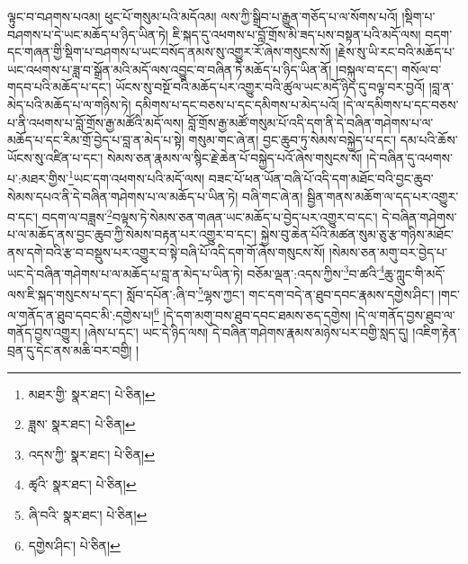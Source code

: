 ལྟུང་བ་བཤགས་པའམ། ཕུང་པོ་གསུམ་པའི་མདོའམ། ལས་ཀྱི་སྒྲིབ་པ་རྒྱུན་གཅོད་པ་ལ་སོགས་པའོ། །སྡིག་པ་བཤགས་པ་དེ་ཡང་མཆོད་པ་ཉིད་ཡིན་ཏེ། ཇི་སྐད་དུ་འཕགས་པ་བློ་གྲོས་མི་ཟད་པས་བསྟན་པའི་མདོ་ལས། བདག་དང་གཞན་གྱི་སྡིག་པ་བཤགས་པ་ཡང་བསོད་ནམས་སུ་འགྱུར་རོ་ཞེས་གསུངས་སོ། །རྗེས་སུ་ཡི་རང་བའི་མཆོད་པ་ཡང་འཕགས་པ་ཟླ་བ་སྒྲོན་མའི་མདོ་ལས་འབྱུང་བ་བཞིན་ཏེ་མཆོད་པ་ཉིད་ཡིན་ནོ། །བསྐུལ་བ་དང་། གསོལ་བ་གདབ་པའི་མཆོད་པ་དང་། ཡོངས་སུ་བསྔོ་བའི་མཆོད་པར་འགྱུར་བའི་ཚུལ་ཡང་མདོ་ཉིད་དུ་བལྟ་བར་བྱའོ། །བླ་ན་མེད་པའི་མཆོད་པ་ལ་གཉིས་ཏེ། དམིགས་པ་དང་བཅས་པ་དང་དམིགས་པ་མེད་པའོ། །དེ་ལ་དམིགས་པ་དང་བཅས་པ་ནི་འཕགས་པ་བློ་གྲོས་རྒྱ་མཚོའི་མདོ་ལས། བློ་གྲོས་རྒྱ་མཚོ་གསུམ་པོ་འདི་དག་ནི་དེ་བཞིན་གཤེགས་པ་ལ་མཆོད་པ་དང་རིམ་གྲོ་བྱེད་པ་བླ་ན་མེད་པ་སྟེ། གསུམ་གང་ཞེ་ན། བྱང་ཆུབ་ཏུ་སེམས་བསྐྱེད་པ་དང་། དམ་པའི་ཆོས་ཡོངས་སུ་འཛིན་པ་དང་། སེམས་ཅན་རྣམས་ལ་སྙིང་རྗེ་ཆེན་པོ་བསྐྱེད་པའོ་ཞེས་གསུངས་སོ། །དེ་བཞིན་དུ་འཕགས་པ་:མཐར་གྱིས་\footnote{མཐར་གྱི་  སྣར་ཐང་།  པེ་ཅིན། }ཡང་དག་འཕགས་པའི་མདོ་ལས། བཟང་པོ་ཕན་ཡོན་བཞི་པོ་འདི་དག་མཐོང་བའི་བྱང་ཆུབ་སེམས་དཔའ་ནི་དེ་བཞིན་གཤེགས་པ་ལ་མཆོད་པ་ཡིན་ཏེ། བཞི་གང་ཞེ་ན། སྦྱིན་གནས་མཆོག་ལ་དད་པར་འགྱུར་བ་དང་། བདག་ལ་བཟླས་\footnote{ཟླས་  སྣར་ཐང་།  པེ་ཅིན། }བལྟས་ཏེ་སེམས་ཅན་གཞན་ཡང་མཆོད་པ་བྱེད་པར་འགྱུར་བ་དང་། དེ་བཞིན་གཤེགས་པ་ལ་མཆོད་ནས་བྱང་ཆུབ་ཀྱི་སེམས་བརྟན་པར་འགྱུར་བ་དང་། སྐྱེས་བུ་ཆེན་པོའི་མཚན་སུམ་ཅུ་རྩ་གཉིས་མཐོང་ནས་དགེ་བའི་རྩ་བ་བསྡུས་པར་འགྱུར་བ་སྟེ་བཞི་པོ་འདི་དག་གོ་ཞེས་གསུངས་སོ། །སེམས་ཅན་མགུ་བར་བྱེད་པ་ཡང་དེ་བཞིན་གཤེགས་པ་ལ་མཆོད་པ་བླ་ན་མེད་པ་ཡིན་ཏེ། བཅོམ་ལྡན་:འདས་ཀྱིས་\footnote{འདས་ཀྱི་  སྣར་ཐང་།  པེ་ཅིན། }བ་ཚའི་\footnote{ཚྭའི་  སྣར་ཐང་།  པེ་ཅིན། }ཆུ་ཀླུང་གི་མདོ་ལས་ཇི་སྐད་གསུངས་པ་དང་། སློབ་དཔོན་:ཞི་བ་\footnote{ཞི་བའི་  སྣར་ཐང་།  པེ་ཅིན། }ལྷས་ཀྱང་། གང་དག་བདེ་ན་ཐུབ་དབང་རྣམས་དགྱེས་ཤིང་། །གང་ལ་གནོད་ན་ཐུབ་དབང་མི་:དགྱེས་པ།\footnote{དགྱེས་ཤིང་།  པེ་ཅིན། } །དེ་དག་མགུ་བས་ཐུབ་དབང་ཐམས་ཅད་དགྱེས། །དེ་ལ་གནོད་བྱས་ཐུབ་ལ་གནོད་བྱས་འགྱུར། །ཞེས་པ་དང་། ཡང་དེ་ཉིད་ལས། དེ་བཞིན་གཤེགས་རྣམས་མཉེས་པར་བགྱི་སླད་དུ། །འཇིག་རྟེན་བྲན་དུ་དེང་ནས་མཆི་བར་བགྱི། །
